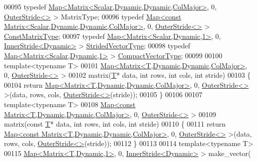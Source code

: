 \begin{DoxyCode}
00095 \textcolor{keyword}{typedef} \hyperlink{group___core___module_class_eigen_1_1_map}{Map<Matrix<Scalar,Dynamic,Dynamic,ColMajor>}, 0, 
      \hyperlink{class_eigen_1_1_outer_stride}{OuterStride<>} > MatrixType;
00096 \textcolor{keyword}{typedef} \hyperlink{group___core___module_class_eigen_1_1_map}{Map<const Matrix<Scalar,Dynamic,Dynamic,ColMajor>},
       0, \hyperlink{class_eigen_1_1_outer_stride}{OuterStride<>} > \hyperlink{group___core___module_class_eigen_1_1_map}{ConstMatrixType};
00097 \textcolor{keyword}{typedef} \hyperlink{group___core___module_class_eigen_1_1_map}{Map<Matrix<Scalar,Dynamic,1>}, 0, 
      \hyperlink{class_eigen_1_1_inner_stride}{InnerStride<Dynamic>} > \hyperlink{group___core___module_class_eigen_1_1_map}{StridedVectorType};
00098 \textcolor{keyword}{typedef} \hyperlink{group___core___module_class_eigen_1_1_map}{Map<Matrix<Scalar,Dynamic,1>} > 
      \hyperlink{group___core___module_class_eigen_1_1_map}{CompactVectorType};
00099 
00100 \textcolor{keyword}{template}<\textcolor{keyword}{typename} T>
00101 \hyperlink{group___core___module_class_eigen_1_1_map}{Map<Matrix<T,Dynamic,Dynamic,ColMajor>}, 0, 
      \hyperlink{class_eigen_1_1_outer_stride}{OuterStride<>} >
00102 matrix(\hyperlink{group___sparse_core___module}{T}* data, \textcolor{keywordtype}{int} rows, \textcolor{keywordtype}{int} cols, \textcolor{keywordtype}{int} stride)
00103 \{
00104   \textcolor{keywordflow}{return} \hyperlink{group___core___module_class_eigen_1_1_map}{Map<Matrix<T,Dynamic,Dynamic,ColMajor>}, 0, 
      \hyperlink{class_eigen_1_1_outer_stride}{OuterStride<>} >(data, rows, cols, \hyperlink{class_eigen_1_1_outer_stride}{OuterStride<>}(stride));
00105 \}
00106 
00107 \textcolor{keyword}{template}<\textcolor{keyword}{typename} T>
00108 \hyperlink{group___core___module_class_eigen_1_1_map}{Map<const Matrix<T,Dynamic,Dynamic,ColMajor>}, 0, 
      \hyperlink{class_eigen_1_1_outer_stride}{OuterStride<>} >
00109 matrix(\textcolor{keyword}{const} \hyperlink{group___sparse_core___module}{T}* data, \textcolor{keywordtype}{int} rows, \textcolor{keywordtype}{int} cols, \textcolor{keywordtype}{int} stride)
00110 \{
00111   \textcolor{keywordflow}{return} \hyperlink{group___core___module_class_eigen_1_1_map}{Map<const Matrix<T,Dynamic,Dynamic,ColMajor>}, 0, 
      \hyperlink{class_eigen_1_1_outer_stride}{OuterStride<>} >(data, rows, cols, \hyperlink{class_eigen_1_1_outer_stride}{OuterStride<>}(stride));
00112 \}
00113 
00114 \textcolor{keyword}{template}<\textcolor{keyword}{typename} T>
00115 \hyperlink{group___core___module_class_eigen_1_1_map}{Map<Matrix<T,Dynamic,1>}, 0, \hyperlink{class_eigen_1_1_inner_stride}{InnerStride<Dynamic>} > make\_vector(

\end{DoxyCode}
